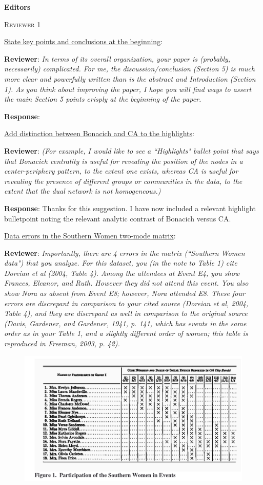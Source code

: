 \documentclass{article}
\begin{document}
\textbf{Editors}

\textsc{Reviewer 1}

\underline{State key points and conclusions at the beginning}:

\textbf{Reviewer}: \textit{In terms of its overall organization, your paper is (probably, necessarily) complicated. For me, the discussion/conclusion (Section 5) is much more clear and powerfully written than is the abstract and Introduction (Section 1). As you think about improving the paper, I hope you will find ways to assert the main Section 5 points crisply at the beginning of the paper.} 

\textbf{Response}: 

\underline{Add distinction between Bonacich and CA to the highlights}:

\textbf{Reviewer}: \textit{(For example, I would like to see a ``Highlights" bullet point that says that Bonacich centrality is useful for revealing the position of the nodes in a center-periphery pattern, to the extent one exists, whereas CA is useful for revealing the presence of different groups or communities in the data, to the extent that the dual network is not homogeneous.)}

\textbf{Response}: Thanks for this suggestion. I have now included a relevant highlight bulletpoint noting the relevant analytic contrast of Bonacich versus CA.

\underline{Data errors in the Southern Women two-mode matrix}:

\textbf{Reviewer}: \textit{Importantly, there are 4 errors in the matrix (``Southern Women data") that you analyze. For this dataset, you (in the note to Table 1) cite Doreian et al (2004, Table 4). Among the attendees at Event E4, you show Frances, Eleanor, and Ruth. However they did not attend this event. You also show Nora as absent from Event E8; however, Nora attended E8. These four errors are discrepant in comparison to your cited source (Doreian et al, 2004, Table 4), and they are discrepant as well in comparison to the original source (Davis, Gardener, and Gardener, 1941, p. 141, which has events in the same order as in your Table 1, and a slightly different order of women; this table is reproduced in Freeman, 2003, p. 42).}

\begin{figure}[h!]
    \includegraphics[width=1.0\textwidth]{Reviews and Response/sw-original.png}
\end{figure}
\end{document}

